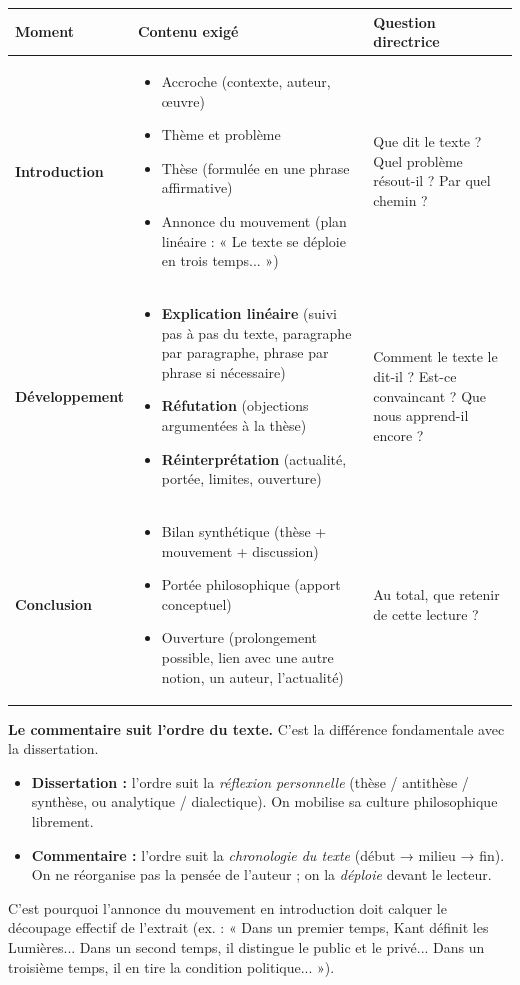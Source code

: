 \documentclass[11pt]{article}
\begin{document}
\begin{center}
\begin{tabularx}{\linewidth}{|l|X|X|}
\hline
\rowcolor{popblueL}
\textbf{Moment} & \textbf{Contenu exigé} & \textbf{Question directrice} \\
\hline
\textbf{Introduction} & \begin{itemize}\item Accroche (contexte, auteur, œuvre)\item Thème et problème\item Thèse (formulée en une phrase affirmative)\item Annonce du mouvement (plan linéaire : « Le texte se déploie en trois temps... »)\end{itemize} & Que dit le texte ? Quel problème résout-il ? Par quel chemin ? \\
\hline
\textbf{Développement} & \begin{itemize}\item \textbf{Explication linéaire} (suivi pas à pas du texte, paragraphe par paragraphe, phrase par phrase si nécessaire)\item \textbf{Réfutation} (objections argumentées à la thèse)\item \textbf{Réinterprétation} (actualité, portée, limites, ouverture)\end{itemize} & Comment le texte le dit-il ? Est-ce convaincant ? Que nous apprend-il encore ? \\
\hline
\textbf{Conclusion} & \begin{itemize}\item Bilan synthétique (thèse + mouvement + discussion)\item Portée philosophique (apport conceptuel)\item Ouverture (prolongement possible, lien avec une autre notion, un auteur, l'actualité)\end{itemize} & Au total, que retenir de cette lecture ? \\
\hline
\end{tabularx}
\end{center}

\begin{aretenir}
\textbf{Le commentaire suit l'ordre du texte.} C'est la différence fondamentale avec la dissertation.
\begin{itemize}
    \item \textbf{Dissertation :} l'ordre suit la \emph{réflexion personnelle} (thèse / antithèse / synthèse, ou analytique / dialectique). On mobilise sa culture philosophique librement.
    \item \textbf{Commentaire :} l'ordre suit la \emph{chronologie du texte} (début → milieu → fin). On ne réorganise pas la pensée de l'auteur ; on la \emph{déploie} devant le lecteur.
\end{itemize}
C'est pourquoi l'annonce du mouvement en introduction doit calquer le découpage effectif de l'extrait (ex. : « Dans un premier temps, Kant définit les Lumières... Dans un second temps, il distingue le public et le privé... Dans un troisième temps, il en tire la condition politique... »).
\end{aretenir}
\end{document}

